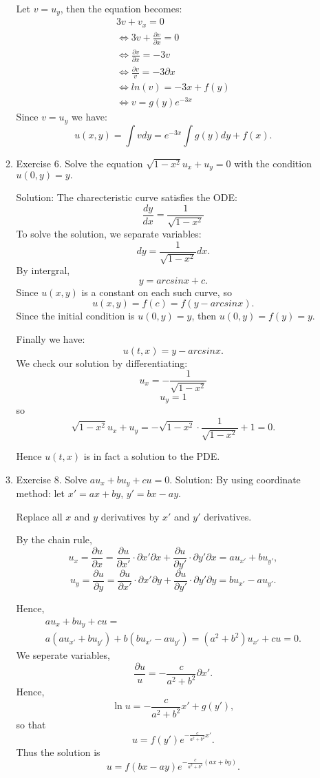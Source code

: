 \documentclass{article}
\begin{document}
\begin{enumerate}
\begin{enumerate}
			Let $v=u_y$, then the equation becomes:
			\begin{align*}
				 3v+v_x=0 \\
				 \iff 3v+\frac{\partial v}{\partial x}=0 \\
				 \iff \frac{\partial v}{\partial x}=-3v \\
				 \iff \frac{\partial v}{v}=-3\partial x \\
				 \iff ln(v) = -3x + f(y) \\
				 \iff v = g(y)e^{-3x}
			\end{align*}
			Since $v=u_y$ we have:
			\[u(x,y)=\int vdy = e^{-3x}\int g(y)dy + f(x).\]

		\item Exercise 6. Solve the equation $\sqrt{1-x^2}u_x+u_y=0$ with the condition $u(0, y)=y.$
		
            Solution: The charecteristic curve satisfies the ODE: 
            \[ \frac{dy}{dx}=\frac{1}{\sqrt{1-x^2}}\]
			To solve the solution, we separate variables: 		
			\[ dy=\frac{1}{\sqrt{1-x^2}}dx.\]
			By intergral, \[y= arcsinx + c .\]
			Since $u(x,y)$ is a constant on each such curve, so
			\[ u(x,y)=f(c)=f(y - arcsinx).\]
			Since the initial condition is $u(0,y)=y$, then $u(0,y)=f(y)=y.$

			Finally we have:
			\[u(t,x)=y - arcsinx.\]
			We check our solution by differentiating:
			\[u_x=-\frac{1}{\sqrt{1-x^2}}\]
			\[u_y=1\]
			so \[\sqrt{1-x^2}u_x+u_y=-\sqrt{1-x^2} \cdot \frac{1}{\sqrt{1-x^2}}+1=0.\]

			Hence $u(t,x)$ is in fact a solution to the PDE.


		\item Exercise 8. Solve $au_x+bu_y+cu=0.$
		Solution:
		By using coordinate method: let $x'=ax+by$, $y'=bx-ay$.

		Replace all $x$ and $y$ derivatives by $x'$ and $y'$ derivatives.

		By the chain rule, \[u_x=\frac{\partial u}{\partial x}=\frac{\partial u}{\partial x'}\cdot{\partial x'}{\partial x}+\frac{\partial u}{\partial y'}\cdot{\partial y'}{\partial x}=au_{x'}+bu_{y'},\]
		\[u_y=\frac{\partial u}{\partial y}=\frac{\partial u}{\partial x'}\cdot{\partial x'}{\partial y}+\frac{\partial u}{\partial y'}\cdot{\partial y'}{\partial y}=bu_{x'}-au_{y'}.\]

		Hence,
		\begin{align*}
			au_x+bu_y+cu=\\
			a\left(au_{x'}+bu_{y'} \right)+b\left(bu_{x'}-au_{y'}\right)=\left(a^2+b^2\right)u_{x'}+cu=0.
		\end{align*}
		We seperate variables, \[\frac{\partial u}{u}=-\frac{c}{a^2+b^2}\partial x'.\]
		Hence, \[\ln u = -\frac{c}{a^2+b^2}x' +g(y'),\] so that \[ u = f(y')e^{-\frac{c}{a^2+b^2}x'}.\]
		Thus the solution is  \[ u = f(bx-ay)e^{-\frac{c}{a^2+b^2}(ax+by)}.\]


\end{enumerate}
\end{enumerate}
\end{document}
